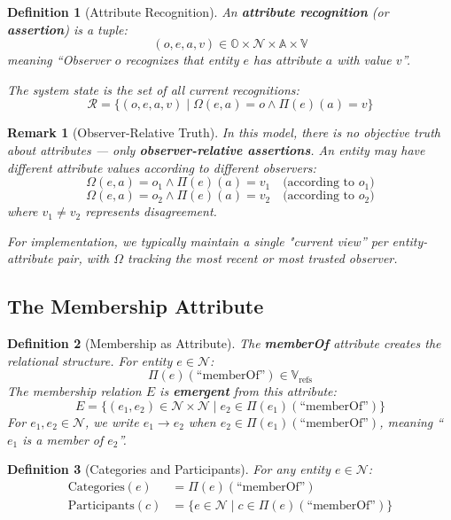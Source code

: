 \documentclass[11pt]{article}
\newtheorem{definition}{Definition}
\newtheorem{remark}{Remark}
\begin{document}
\begin{definition}[Attribute Recognition]
An \textbf{attribute recognition} (or \textbf{assertion}) is a tuple:
\[
(o, e, a, v) \in \mathbb{O} \times \mathcal{N} \times \mathbb{A} \times \mathbb{V}
\]
meaning ``Observer $o$ recognizes that entity $e$ has attribute $a$ with value $v$''.

The system state is the set of all current recognitions:
\[
\mathcal{R} = \{ (o, e, a, v) \mid \Omega(e, a) = o \land \Pi(e)(a) = v \}
\]
\end{definition}

\begin{remark}[Observer-Relative Truth]
In this model, there is no objective truth about attributes — only \textbf{observer-relative assertions}. An entity may have different attribute values according to different observers:
\[
\Omega(e, a) = o_1 \land \Pi(e)(a) = v_1 \quad \text{(according to } o_1\text{)}
\]
\[
\Omega(e, a) = o_2 \land \Pi(e)(a) = v_2 \quad \text{(according to } o_2\text{)}
\]
where $v_1 \neq v_2$ represents disagreement.

For implementation, we typically maintain a single "current view'' per entity-attribute pair, with $\Omega$ tracking the most recent or most trusted observer.
\end{remark}

\subsection{The Membership Attribute}

\begin{definition}[Membership as Attribute]
The \textbf{memberOf} attribute creates the relational structure. For entity $e \in \mathcal{N}$:
\[
\Pi(e)(\text{``memberOf''}) \in \mathbb{V}_{\text{refs}}
\]
The membership relation $E$ is \textbf{emergent} from this attribute:
\[
E = \{ (e_1, e_2) \in \mathcal{N} \times \mathcal{N} \mid e_2 \in \Pi(e_1)(\text{``memberOf''}) \}
\]
For $e_1, e_2 \in \mathcal{N}$, we write $e_1 \to e_2$ when $e_2 \in \Pi(e_1)(\text{``memberOf''})$, meaning ``$e_1$ is a member of $e_2$''.
\end{definition}

\begin{definition}[Categories and Participants]
For any entity $e \in \mathcal{N}$:
\begin{align}
\text{Categories}(e) &= \Pi(e)(\text{``memberOf''}) \\
\text{Participants}(c) &= \{ e \in \mathcal{N} \mid c \in \Pi(e)(\text{``memberOf''}) \}
\end{align}
\end{definition}
\end{document}
